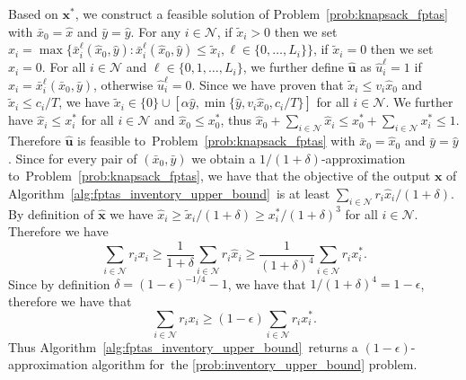 \documentclass[mnsc,non-blindrev]{informs3}
\theoremstyle{definition}
\begin{document}
\begin{appendices}{\Large{}}
Based on $\bm{x}^*$, we construct a feasible solution of Problem~\eqref{prob:knapsack_fptas} with $\bar{x}_0=\hat{x}$ and $\bar{y}=\hat{y}$. For any $i\in\mathcal{N}$, if $\tilde{x}_i>0$ then we set $\hat{x}_i=\max\{\bar{x}_i^\ell(\hat{x}_0,\hat{y}):\bar{x}_i^\ell(\hat{x}_0,\hat{y})\leq \tilde{x}_i,\ell\in\{0,\dots,L_i\}\}$, if $\tilde{x}_i=0$ then we set $\hat{x}_i=0$. For all $i\in\mathcal{N}$ and $\ell\in\{0,1,\dots,L_i\}$, we further define $\hat{\bm{u}}$ as $\hat{u}_i^\ell=1$ if \mbox{$\hat{x}_i=\bar{x}_i^\ell(\bar{x}_0,\bar{y})$,} otherwise $\hat{u}_i^\ell=0$. Since we have proven that $\tilde{x}_i\leq v_i\hat{x}_0$ and $\tilde{x}_i\leq c_i/T$, we have $\tilde{x}_i\in\{0\}\cup[\alpha\hat{y},\min\{\hat{y},v_i\hat{x}_0,c_i/T\}]$ for all $i\in\mathcal{N}$. We further have \mbox{$\hat{x}_i\leq x_i^*$} for all $i\in\mathcal{N}$ and $\hat{x}_0\leq x_0^*$, thus $\hat{x}_0+\sum_{i\in\mathcal{N}}\hat{x}_i\leq x_0^*+\sum_{i\in\mathcal{N}}x_i^*\leq 1$. Therefore $\hat{\bm{u}}$ is feasible to~Problem~\eqref{prob:knapsack_fptas} with $\bar{x}_0=\hat{x}_0$ and $\bar{y}=\hat{y}$. Since for every pair of $(\bar{x}_0,\bar{y})$ we obtain a $1/(1+\delta)$-approximation to~Problem~\eqref{prob:knapsack_fptas}, we have that the objective of the output $\bm{x}$ of Algorithm~\ref{alg:fptas_inventory_upper_bound}~is at least \mbox{$\sum_{i\in\mathcal{N}}r_i\hat{x}_i/(1+\delta)$.} By definition of $\hat{\bm{x}}$ we have \mbox{$\hat{x}_i\geq \tilde{x}_i/(1+\delta)\geq x_i^*/(1+\delta)^3$} for all $i\in\mathcal{N}$. Therefore we have
\begin{equation*}
\sum_{i\in\mathcal{N}}r_ix_i\geq \dfrac{1}{1+\delta}\sum_{i\in\mathcal{N}}r_i\hat{x}_i\geq \dfrac{1}{(1+\delta)^4}\sum_{i\in\mathcal{N}}r_ix_i^*.
\end{equation*}
Since by definition $\delta=(1-\epsilon)^{-1/4}-1$, we have that $1/(1+\delta)^4=1-\epsilon$, therefore we have that
\begin{equation*}
\sum_{i\in\mathcal{N}}r_ix_i\geq (1-\epsilon) \sum_{i\in\mathcal{N}}r_ix_i^*.
\end{equation*}
Thus Algorithm~\ref{alg:fptas_inventory_upper_bound}~returns a $(1-\epsilon)$-approximation algorithm for~the \ref{prob:inventory_upper_bound} problem.


\end{appendices}
\end{document}
